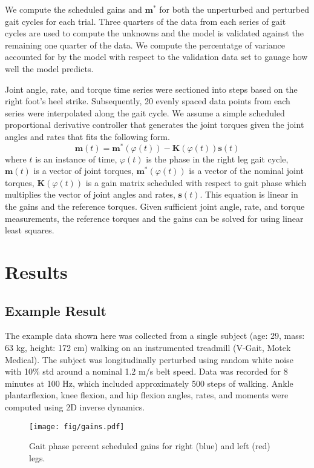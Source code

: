 \documentclass{article}
\begin{document}
We compute the scheduled gains and $\mathbf{m}^*$ for both the unperturbed and
perturbed gait cycles for each trial. Three quarters of the data from each
series of gait cycles are used to compute the unknowns and the model is
validated against the remaining one quarter of the data. We compute the
percentatge of variance accounted for by the model with respect to the
validation data set to gauage how well the model predicts.



Joint angle, rate, and torque time series were sectioned into steps based on
the right foot's heel strike. Subsequently, 20 evenly spaced data points from
each series were interpolated along the gait cycle. We assume a simple
scheduled proportional derivative controller that generates the joint torques
given the joint angles and rates that fits the following form.
%
\begin{equation}
  \mathbf{m}(t) = \mathbf{m}^*(\varphi(t)) -
  \mathbf{K}(\varphi(t))\mathbf{s}(t)
\end{equation}
%
where $t$ is an instance of time, $\varphi(t)$ is the phase in the right leg
gait cycle, $\mathbf{m}(t)$ is a vector of joint torques,
$\mathbf{m}^*(\varphi(t))$ is a vector of the nominal joint torques,
$\mathbf{K}(\varphi(t))$ is a gain matrix scheduled with respect to gait
phase which multiplies the vector of joint angles and rates, $\mathbf{s}(t)$.
This equation is linear in the gains and the reference torques. Given
sufficient joint angle, rate, and torque measurements, the reference torques
and the gains can be solved for using linear least squares.

\section*{Results}
%
\subsection{Example Result}
%
The example data shown here was collected from a single subject (age: 29, mass:
63 kg, height: 172 cm) walking on an instrumented treadmill (V-Gait, Motek
Medical). The subject was longitudinally perturbed using random white noise
with 10\% std around a nominal 1.2 m/s belt speed. Data was recorded for 8
minutes at 100 Hz, which included approximately 500 steps of walking. Ankle
plantarflexion, knee flexion, and hip flexion angles, rates, and moments were
computed using 2D inverse dynamics.
%
\begin{figure}[hbt]
  \begin{center}
    \texttt{[image: fig/gains.pdf]}
    \caption{Gait phase percent scheduled gains for right (blue) and left (red) legs.}
    \label{fig:gains}
  \end{center}
\end{figure}
\end{document}
